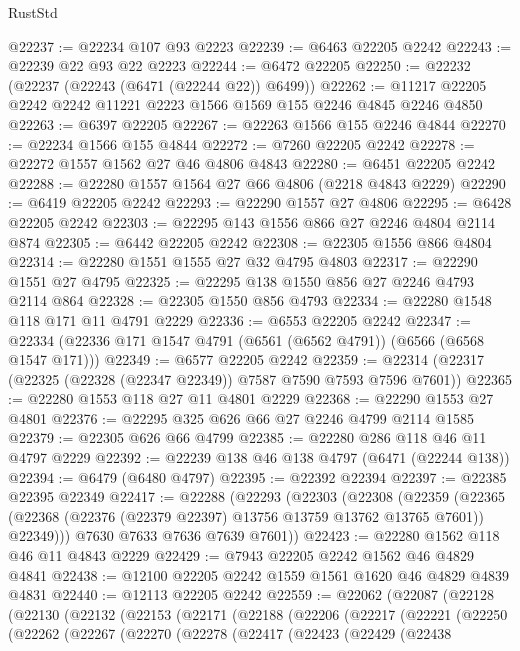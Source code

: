 \begin{lexlean}{RustStd}
\begin{coremodule}
{\begin{coremodule}
{{{{{{{{{{{{{{{{{{{{{{{{{{@22237 := @22234 @107 @93 @2223
@22239 := @6463 @22205 @2242
@22243 := @22239 @22 @93 @22 @2223
@22244 := @6472 @22205
@22250 := @22232 (@22237 (@22243 (@6471 (@22244 @22)) @6499))
@22262 := @11217 @22205 @2242 @2242 @11221 @2223 @1566 @1569 @155 @2246 @4845 @2246 @4850
@22263 := @6397 @22205
@22267 := @22263 @1566 @155 @2246 @4844
@22270 := @22234 @1566 @155 @4844
@22272 := @7260 @22205 @2242
@22278 := @22272 @1557 @1562 @27 @46 @4806 @4843
@22280 := @6451 @22205 @2242
@22288 := @22280 @1557 @1564 @27 @66 @4806 (@2218 @4843 @2229)
@22290 := @6419 @22205 @2242
@22293 := @22290 @1557 @27 @4806
@22295 := @6428 @22205 @2242
@22303 := @22295 @143 @1556 @866 @27 @2246 @4804 @2114 @874
@22305 := @6442 @22205 @2242
@22308 := @22305 @1556 @866 @4804
@22314 := @22280 @1551 @1555 @27 @32 @4795 @4803
@22317 := @22290 @1551 @27 @4795
@22325 := @22295 @138 @1550 @856 @27 @2246 @4793 @2114 @864
@22328 := @22305 @1550 @856 @4793
@22334 := @22280 @1548 @118 @171 @11 @4791 @2229
@22336 := @6553 @22205 @2242
@22347 := @22334 (@22336 @171 @1547 @4791 (@6561 (@6562 @4791)) (@6566 (@6568 @1547 @171)))
@22349 := @6577 @22205 @2242
@22359 := @22314 (@22317 (@22325 (@22328 (@22347 @22349)) @7587 @7590 @7593 @7596 @7601))
@22365 := @22280 @1553 @118 @27 @11 @4801 @2229
@22368 := @22290 @1553 @27 @4801
@22376 := @22295 @325 @626 @66 @27 @2246 @4799 @2114 @1585
@22379 := @22305 @626 @66 @4799
@22385 := @22280 @286 @118 @46 @11 @4797 @2229
@22392 := @22239 @138 @46 @138 @4797 (@6471 (@22244 @138))
@22394 := @6479 (@6480 @4797)
@22395 := @22392 @22394
@22397 := @22385 @22395 @22349
@22417 := @22288
    (@22293
      (@22303
        (@22308
          (@22359
            (@22365 (@22368 (@22376 (@22379 @22397) @13756 @13759 @13762 @13765 @7601)) @22349)))
        @7630
        @7633
        @7636
        @7639
        @7601))
@22423 := @22280 @1562 @118 @46 @11 @4843 @2229
@22429 := @7943 @22205 @2242 @1562 @46 @4829 @4841
@22438 := @12100 @22205 @2242 @1559 @1561 @1620 @46 @4829 @4839 @4831
@22440 := @12113 @22205 @2242
@22559 := @22062
    (@22087
      (@22128
        (@22130
          (@22132
            (@22153
              (@22171
                (@22188
                  (@22206
                    (@22217
                      (@22221
                        (@22250
                          (@22262
                            (@22267
                              (@22270
                                (@22278
                                  (@22417
                                    (@22423
                                      (@22429
                                        (@22438
}}}}}}}}}}}}}}}}}}}}}}}}}}
\end{coremodule}}
\end{coremodule}
\end{lexlean}
